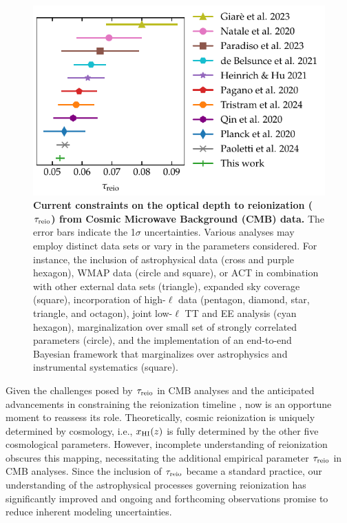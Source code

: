 \begin{figure}[tb]
\centering
\includegraphics{figs/tau_fig.pdf}
\caption{\textbf{Current constraints on the optical depth to
reionization ($\tau_{\mathrm{reio}}$) from Cosmic Microwave Background (CMB)
data.}
The error bars indicate the 1$\sigma$ uncertainties.
Various analyses may employ distinct data sets or vary in the parameters
considered.
For instance, the inclusion of astrophysical data \cite{Qin2020,
Paoletti2024} (cross and purple hexagon), WMAP data \cite{Natale2020,
Paradiso2023} (circle and square), or ACT in combination with other
external data sets \cite{Giare2023} (triangle), expanded sky coverage
\cite{Paradiso2023} (square), incorporation of high-$\ell$ data
\cite{Pagano2020, Planck2020a, HeinrichHu2021, Giare2023, Tristram2024}
(pentagon, diamond, star, triangle, and octagon), joint low-$\ell$ TT
and EE analysis \cite{deBelsunce2021} (cyan hexagon), marginalization
over small set of strongly correlated parameters \cite{Natale2020}
(circle), and the implementation of an end-to-end Bayesian framework
that marginalizes over astrophysics and instrumental systematics
\cite{Paradiso2023} (square).}
\label{fig:tau}
\end{figure}

Given the challenges posed by $\tau_{\mathrm{reio}}$ in CMB analyses and the
anticipated advancements in constraining the reionization
timeline \cite{Montero2021, Hera2022}, now is an opportune moment to
reassess its role.
Theoretically, cosmic reionization is uniquely determined by cosmology,
i.e., $x_{\mathrm{HI}}(z)$ is fully determined by the other five cosmological
parameters.
However, incomplete understanding of reionization obscures this mapping,
necessitating the additional empirical parameter $\tau_{\mathrm{reio}}$ in CMB
analyses.
Since the inclusion of $\tau_{\mathrm{reio}}$ became a standard practice, our
understanding of the astrophysical processes governing reionization has
significantly improved \cite{Gnedin2022, Kannan2022,Murray2020, Fan2023}
and ongoing and forthcoming observations promise to reduce inherent
modeling uncertainties.

